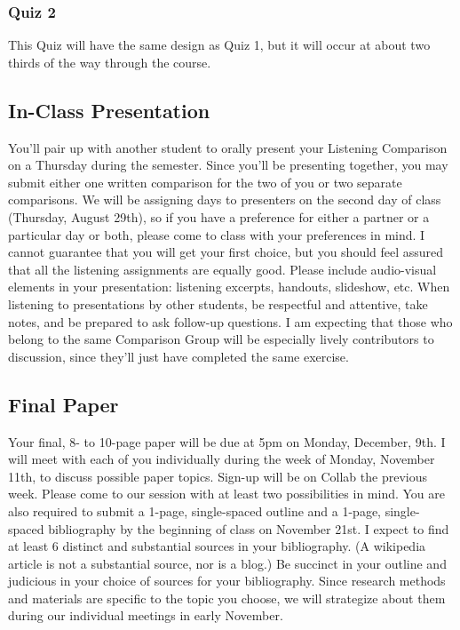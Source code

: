 \documentclass[letterpaper,10pt,english]{sphinxmanual}
\begin{document}
\subsubsection{Quiz 2}
\label{syllabus:quiz-2}
This Quiz will have the same design as Quiz 1, but
it will occur at about two thirds of the way through the course.


\subsection{In-Class Presentation}
\label{syllabus:in-class-presentation}
You’ll pair up with another student to orally present your
Listening Comparison on a Thursday during the semester.
Since you'll be presenting together, you may submit either
one written comparison for the two of you or two separate comparisons.
We will be assigning days to presenters on the second day of class
(Thursday, August 29th), so if you have a preference for either
a partner or a particular day or both, please come to class
with your preferences in mind. I cannot guarantee that you
will get your first choice, but you should feel assured that
all the listening assignments are equally good. Please
include audio-visual elements in your presentation: listening
excerpts, handouts, slideshow, etc. When listening to
presentations by other students, be respectful
and attentive, take notes, and be prepared to ask
follow-up questions. I am expecting that those who belong
to the same Comparison Group will be especially lively
contributors to discussion, since they'll just have
completed the same exercise.


\subsection{Final Paper}
\label{syllabus:final-paper}
Your final, 8- to 10-page paper will be due at 5pm on Monday, December, 9th.
I will meet with each of you individually during the week of Monday, November 11th,
to discuss possible paper topics. Sign-up will be on Collab the previous week.
Please come to our session with at least two possibilities in mind. You are
also required to submit a 1-page, single-spaced outline and a 1-page,
single-spaced bibliography by the beginning of class on November 21st.
I expect to find at least 6 distinct and substantial sources in your
bibliography. (A wikipedia article is not a substantial source, nor is a blog.)
Be succinct in your outline and judicious in your choice of sources
for your bibliography. Since research methods and materials are specific
to the topic you choose, we will strategize about them
during our individual meetings in early November.
\end{document}
